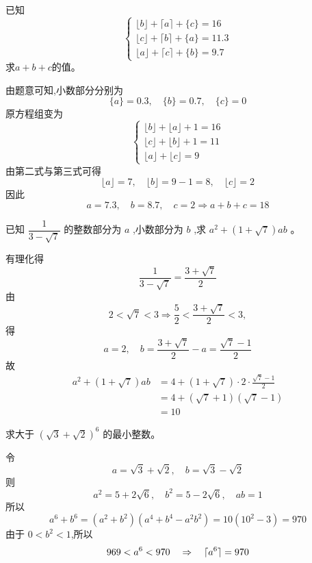 \begin{questions}
    \question 已知
    \[
    \begin{cases}
    \lfloor b \rfloor + \lceil a \rceil + \{c\} = 16 \\
    \lfloor c \rfloor + \lceil b \rceil + \{a\} = 11.3 \\
    \lfloor a \rfloor + \lceil c \rceil + \{b\} = 9.7
    \end{cases}
    \]
    求$a+b+c$的值。
    \begin{solution}
        由题意可知,小数部分分别为
        \[
        \{a\}=0.3,\quad \{b\}=0.7,\quad \{c\}=0
        \]
        原方程组变为
        \[
        \begin{cases}
        \lfloor b \rfloor + \lfloor a \rfloor + 1 = 16 \\
        \lfloor c \rfloor + \lfloor b \rfloor + 1 = 11 \\
        \lfloor a \rfloor + \lfloor c \rfloor = 9
        \end{cases}
        \]
        由第二式与第三式可得
        \[
        \lfloor a \rfloor =7, \quad \lfloor b \rfloor = 9-1=8, \quad \lfloor c \rfloor = 2
        \]
        因此
        \[
        a=7.3,\quad b=8.7,\quad c=2 \Rightarrow a+b+c=18
        \]
    \end{solution}

    \question 已知 $\dfrac{1}{3-\sqrt{7}}$ 的整数部分为 $a$ ,小数部分为 $b$ ,求 $a^2 + (1+\sqrt{7})ab$ 。
    \begin{solution}
        有理化得
        \[ 
        \frac{1}{3-\sqrt{7}} = \frac{3+\sqrt{7}}{2} 
        \]
        由 
        \[
        2 < \sqrt{7} < 3 \Rightarrow \frac{5}{2} < \frac{3+\sqrt{7}}{2} < 3,
        \]
        得 
        \[
        a = 2 ,\quad b = \frac{3+\sqrt{7}}{2} - a = \frac{\sqrt{7}-1}{2}
        \]
        故
        \begin{align}
        a^2 + (1+\sqrt{7})ab &= 4 + (1+\sqrt{7}) \cdot 2 \cdot \frac{\sqrt{7}-1}{2} \\
        &= 4 + (\sqrt{7}+1)(\sqrt{7}-1) \\
        &= 10
        \end{align}
    \end{solution}

    \question 求大于 $(\sqrt{3}+\sqrt{2})^{6}$ 的最小整数。
    \begin{solution}
        令
        \[
        a=\sqrt{3}+\sqrt{2},\quad b=\sqrt{3}-\sqrt{2}
        \]
        则
        \[
        a^2 = 5+2\sqrt{6},\quad b^2 = 5-2\sqrt{6},\quad ab = 1
        \]
        所以
        \[
        a^6 + b^6 = (a^2 + b^2)(a^4 + b^4 - a^2b^2) = 10(10^2-3) = 970
        \]
        由于 $0 < b^2 < 1$,所以
        \[
        969 < a^6 < 970 \quad \Rightarrow \quad \lceil a^6\rceil = 970
        \]
    \end{solution}


\end{questions}
